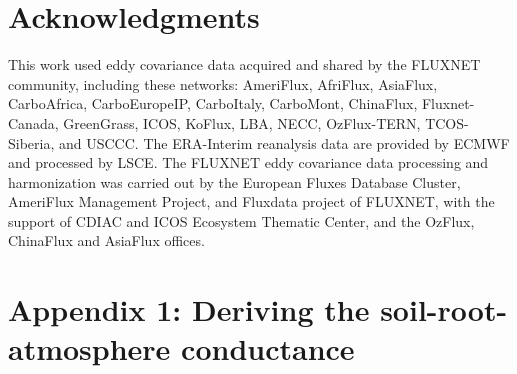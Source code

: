 \documentclass[utf8]{frontiersSCNS} %
\begin{document}
\section*{Acknowledgments}
This work used eddy covariance data acquired and shared by the FLUXNET community, including these networks: AmeriFlux, AfriFlux, AsiaFlux, CarboAfrica, CarboEuropeIP, CarboItaly, CarboMont, ChinaFlux, Fluxnet-Canada, GreenGrass, ICOS, KoFlux, LBA, NECC, OzFlux-TERN, TCOS-Siberia, and USCCC. The ERA-Interim reanalysis data are provided by ECMWF and processed by LSCE. The FLUXNET eddy covariance data processing and harmonization was carried out by the European Fluxes Database Cluster, AmeriFlux Management Project, and Fluxdata project of FLUXNET, with the support of CDIAC and ICOS Ecosystem Thematic Center, and the OzFlux, ChinaFlux and AsiaFlux offices.


\section*{Appendix 1: Deriving the soil-root-atmosphere conductance}
\end{document}
